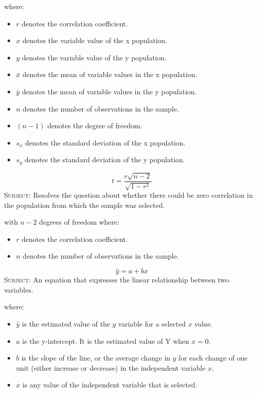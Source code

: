 where:
\begin{itemize}
 \item $r$ denotes the correlation coefficient.
 \item $x$ denotes the variable value of the x population.
 \item $y$ denotes the variable value of the y population.
 \item $\bar{x}$ denotes the mean of variable values in the x population.
 \item $\bar{y}$ denotes the mean of variable values in the y population.
 \item $n$ denotes the number of observations in the sample.
 \item $(n-1)$ denotes the degree of freedom.
 \item $s_{x}$ denotes the standard deviation of the x population.
 \item $s_{y}$ denotes the standard deviation of the y population.
\end{itemize}
\hformbar


\begin{equation}
\label{correlation coefficient t test}
t = \frac{r\sqrt{n-2}}{\sqrt{1-r^2}}
\end{equation}
\textsc{Subject:} Resolves the question about whether there could be zero correlation in the population from which the sample was selected.

with $n-2$ degrees of freedom where:
\begin{itemize}
 \item $r$ denotes the correlation coefficient.
 \item $n$ denotes the number of observations in the sample.
\end{itemize}
\hformbar


\begin{equation}
\label{linear regression equation general form}
\hat{y} = a + bx
\end{equation}
\textsc{Subject:} An equation that expresses the linear relationship between two variables.

where:
\begin{itemize}
 \item $\hat{y}$ is the estimated value of the $y$ variable for a selected $x$ value.
 \item $a$ is the y-intercept. It is the estimated value of Y when $x = 0$.
 \item $b$ is the slope of the line, or the average change in $\hat{y}$ for each change of one unit (either increase or decrease) in the independent variable $x$.
 \item $x$ is any value of the independent variable that is selected.
\end{itemize}
\hformbar


